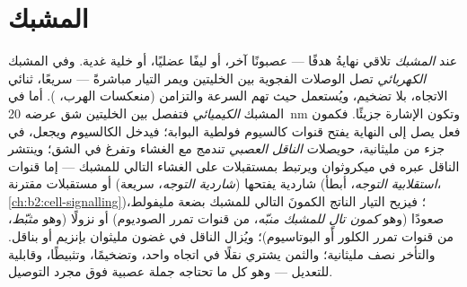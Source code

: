 \section{المشبك}

\begin{definition}\label{def:b2:neurons-synapses:synapse}
عند \emph{المشبك} تلاقي نهايةُ  هدفًا --- عصبونًا
آخر، أو ليفًا عضليًا، أو خلية غدية. وفي المشبك \emph{الكهربائي}
تصل الوصلات الفجوية بين الخليتين ويمر التيار مباشرةً
--- سريعًا، ثنائي الاتجاه، بلا تضخيم، ويُستعمل حيث تهم السرعة
والتزامن (منعكسات الهرب، ). أما في المشبك \emph{الكيميائي}
فتفصل بين الخليتين شق عرضه \qty{20}{nm} وتكون
الإشارة جزيئًا. فكمون فعل يصل إلى النهاية
يفتح قنوات كالسيوم فولطية البوابة؛ فيدخل الكالسيوم ويجعل، في
جزء من مليثانية، حويصلات \emph{الناقل العصبي}
تندمج مع الغشاء وتفرغ في الشق؛ وينتشر الناقل
عبره في ميكروثوان ويرتبط بمستقبلات على الغشاء
التالي للمشبك --- إما قنوات شاردية يفتحها
(\emph{شاردية التوجه}، سريعة) أو مستقبلات مقترنة 
(\emph{استقلابية التوجه}، أبطأ، \cref{ch:b2:cell-signalling})؛
فيزيح التيار الناتج الكمونَ التالي للمشبك بضعة
مليفولط، صعودًا (وهو \emph{كمون تالٍ للمشبك منبّه}، من
قنوات تمرر الصوديوم) أو نزولًا (وهو \emph{مثبّط}، من
قنوات تمرر الكلور أو البوتاسيوم)؛ ويُزال الناقل
في غضون مليثوان بإنزيم أو بناقل. والتأخر
نصف مليثانية؛ والثمن يشتري نقلًا في اتجاه واحد،
وتضخيمًا، وتثبيطًا، وقابلية للتعديل --- وهو كل ما تحتاجه جملة
عصبية فوق مجرد التوصيل.
\end{definition}

